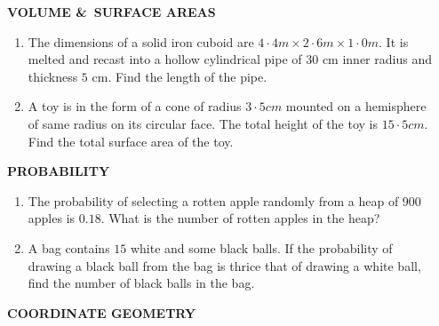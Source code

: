 \documentclass{article}
\begin{document}
\begin{center}
\textbf{VOLUME \&\ SURFACE AREAS}
\end{center}
\begin{enumerate}
	\item The dimensions of a solid iron cuboid are \(4·4m \times 2·6m \times 1·0m\). It is  \\
melted and recast into a hollow cylindrical pipe of $30$ cm inner radius and \\
thickness $5$ cm. Find the length of the pipe.
\item A toy is in the form of a cone of radius $3·5cm$ mounted on a hemisphere \\
of same radius on its circular face. The total height of the toy is $15·5cm$. \\ 
Find the total surface area of the toy.
\end{enumerate}
\begin{center}
	\textbf{PROBABILITY}
\end{center}
\begin{enumerate}
	\item The probability of selecting a rotten apple randomly from a heap of $900$ \\ apples is $0.18$. What is the number of rotten apples in the heap?
	\item A bag contains $15$ white and some black balls. If the probability of \\ drawing a black ball from the bag is thrice that of drawing a white ball, \\ find the number of black balls in the bag.
\end{enumerate}
\begin{center}
\textbf{COORDINATE GEOMETRY}
\end{center}
\end{document}
